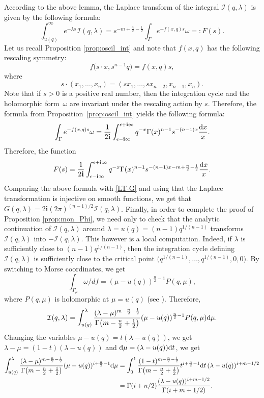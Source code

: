 \documentclass[pdftex]{sigma}
\numberwithin{equation}{section}
\newcommand{\ii}{\mathbf{i}}
\newcommand{\I}{\mathcal{I}}
\begin{document}
According to the above lemma, the Laplace transform of the integral
$\mathcal{I}(q,\lambda)$ is given by the following formula:
\[
\int_{u(q)}^\infty e^{-\lambda s} \mathcal{I}(q,\lambda)=
s^{-m+\frac{n}{2} -\frac{1}{2}}
\int_\Gamma e^{-f(x,q) s} \omega=:F(s).
\]
Let us recall Proposition \ref{prop:oscil_int} and note that $f(x,q)$
has the following rescaling symmetry:
\[
f\big(s\cdot x, s^{n-1} q\big)= f(x,q)s,
\]
 where
\[
s\cdot (x_1,\dots, x_n) = (s x_1,\dots, s x_{n-2}, x_{n-1}, x_n).
\]
Note that if $s>0$ is a positive real number, then the integration
cycle and the holomorphic form~$\omega$ are invariant under the
rescaling action by $s$. Therefore, the formula from Proposition~\ref{prop:oscil_int} yields the following formula:
\[
\int_{\Gamma} e^{-f(x,q) s} \omega = \frac{1}{2\ii}
\int_{\epsilon-\ii\infty}^{\epsilon+\ii\infty}
q^{-x} \Gamma(x)^{n-1} s^{-(n-1) x} \frac{{\rm d}x}{x}.
\]
Therefore, the function
\[
F(s) = \frac{1}{2\ii}
\int_{\epsilon-\ii\infty}^{\epsilon+\ii\infty}
q^{-x} \Gamma(x)^{n-1} s^{-(n-1) x -m+\frac{n}{2} -\frac{1}{2} } \frac{{\rm d}x}{x}.
\]
Comparing the above formula with \eqref{LT-G} and using that the Laplace transformation is injective on smooth functions, we get that
$G(q,\lambda)= 2\ii (2\pi)^{(n-1)/2} \I(q,\lambda)$. Finally, in order
to complete the proof of Proposition \ref{prop:mon_Phi}, we need only
to check that the analytic continuation of $\I(q,\lambda)$ around
$\lambda=u(q)=(n-1) q^{1/(n-1)}$ transforms $\I(q,\lambda)$ into
$-\I(q,\lambda)$. This however is a local computation. Indeed, if
$\lambda$ is sufficiently close to $(n-1) q^{1/(n-1)}$, then the
integration cycle defining $\I(q,\lambda)$ is sufficiently close to
the critical point $\big(q^{1/(n-1)},\dots, q^{1/(n-1)},0,0\big)$. By
switching to Morse coordinates, we get
\[
\int_{\Gamma_\mu} \omega/df = (\mu-u(q))^{\frac{n}{2}-1} P(q,\mu),
\]
where $P(q,\mu)$ is holomorphic at $\mu=u(q)$
(see \cite[Section 12.1, Lemma 2]{AGuV}). Therefore,
\begin{equation}\label{vanishing_period}
\mathcal{I}(q,\lambda) = \int_{u(q)}^\lambda
\frac{(\lambda-\mu)^{m-\frac{n}{2}-\frac{1}{2}} }{
 \Gamma\big(m-\frac{n}{2}+\frac{1}{2}\big) }
(\mu-u(q))^{\frac{n}{2}-1} P(q,\mu){\rm d}\mu.
\end{equation}
Changing the variables $\mu-u(q) = t (\lambda-u(q))$, we get
$\lambda-\mu= (1-t)(\lambda-u(q))$ and ${\rm d}\mu = (\lambda-u(q)) {\rm d}t$, we
get
\begin{align*}
\int_{u(q)}^\lambda
\frac{(\lambda-\mu)^{m-\frac{n}{2}-\frac{1}{2}} }{
 \Gamma\big(m-\frac{n}{2}+\frac{1}{2}\big) }
(\mu-u(q))^{i+\frac{n}{2}-1} {\rm d}\mu & = \int_0^1
\frac{(1-t)^{m-\frac{n}{2}-\frac{1}{2}} }{
 \Gamma\big(m-\frac{n}{2}+\frac{1}{2}\big) } t^{i+\frac{n}{2}-1} {\rm d}t \,
 (\lambda-u(q))^{i+m-1/2}
 \\
 &
 = \Gamma(i+n/2)
\frac{(\lambda-u(q))^{i+m-1/2} }{ \Gamma(i+m+1/2)}.
\end{align*}
\end{document}
